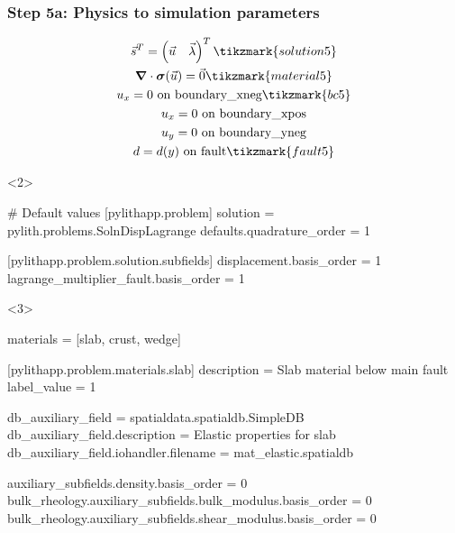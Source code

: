 \documentclass[aspectratio=169]{beamer}
\begin{document}
\begin{frame}[t,fragile]
  \frametitle{Step 5a: Physics to simulation parameters}
  \summary{}

  \begin{minipage}[t]{0.3\textwidth}
    {\scriptsize
    \begin{gather*}
    \vec{s}^T = \left( \vec{u} \quad \vec{\lambda} \right)^T \tikzmark{solution5}\\
    \tensor{\nabla} \cdot \tensor{\sigma}(\vec{u}) = \vec{0} \tikzmark{material5}\\
    u_x = 0 \text{ on boundary\_xneg} \tikzmark{bc5}\\
    u_x = 0 \text{ on boundary\_xpos} \\
    u_y = 0 \text{ on boundary\_yneg} \\
    d = d(y) \text{ on fault} \tikzmark{fault5}
    \end{gather*}}
  \end{minipage}
  \hfill
  \begin{minipage}[t]{0.67\textwidth}
    \begin{onlyenv}<2>
      \begin{cfgcode}
        # Default values
        [pylithapp.problem]
        solution = pylith.problems.SolnDispLagrange
        defaults.quadrature_order = 1
        
        [pylithapp.problem.solution.subfields]
        displacement.basis_order = 1
        lagrange_multiplier_fault.basis_order = 1
      \end{cfgcode}
    \end{onlyenv}
    \begin{onlyenv}<3>
      \begin{cfgcode}
        materials = [slab, crust, wedge]

        [pylithapp.problem.materials.slab]
        description = Slab material below main fault
        label_value = 1

        db_auxiliary_field = spatialdata.spatialdb.SimpleDB
        db_auxiliary_field.description = Elastic properties for slab
        db_auxiliary_field.iohandler.filename = mat_elastic.spatialdb

        auxiliary_subfields.density.basis_order = 0
        bulk_rheology.auxiliary_subfields.bulk_modulus.basis_order = 0
        bulk_rheology.auxiliary_subfields.shear_modulus.basis_order = 0


\end{cfgcode}
\end{onlyenv}
\end{minipage}
\end{frame}
\end{document}
